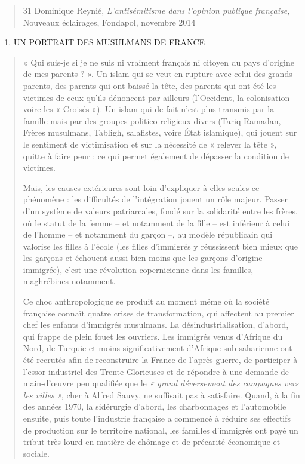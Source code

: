 \begin{quote}
31 Dominique Reynié, \emph{L'antisémitisme dans l'opinion publique
française,} Nouveaux éclairages, Fondapol, novembre 2014
\end{quote}

\begin{enumerate}
\def\labelenumi{\Roman{enumi}.}
\item
  UN PORTRAIT DES MUSULMANS DE FRANCE
\end{enumerate}

\begin{quote}
« Qui suis-je si je ne suis ni vraiment français ni citoyen du pays
d'origine de mes parents ? ». Un islam qui se veut en rupture avec celui
des grands-parents, des parents qui ont baissé la tête, des parents qui
ont été les victimes de ceux qu'ils dénoncent par ailleurs (l'Occident,
la colonisation voire les « Croisés »). Un islam qui de fait n'est plus
transmis par la famille mais par des groupes politico-religieux divers
(Tariq Ramadan, Frères musulmans, Tabligh, salafistes, voire État
islamique), qui jouent sur le sentiment de victimisation et sur la
nécessité de « relever la tête », quitte à faire peur ; ce qui permet
également de dépasser la condition de victimes.

Mais, les causes extérieures sont loin d'expliquer à elles seules ce
phénomène : les difficultés de l'intégration jouent un rôle majeur.
Passer d'un système de valeurs patriarcales, fondé sur la solidarité
entre les frères, où le statut de la femme -- et notamment de la fille
-- est inférieur à celui de l'homme -- et notamment du garçon --, au
modèle républicain qui valorise les filles à l'école (les filles
d'immigrés y réussissent bien mieux que les garçons et échouent aussi
bien moins que les garçons d'origine immigrée), c'est une révolution
copernicienne dans les familles, maghrébines notamment.

Ce choc anthropologique se produit au moment même où la société
française connaît quatre crises de transformation, qui affectent au
premier chef les enfants d'immigrés musulmans. La désindustrialisation,
d'abord, qui frappe de plein fouet les ouvriers. Les immigrés venus
d'Afrique du Nord, de Turquie et moins significativement d'Afrique
sub-saharienne ont été recrutés afin de reconstruire la France de
l'après-guerre, de participer à l'essor industriel des Trente Glorieuses
et de répondre à une demande de main-d'œuvre peu qualifiée que le
\emph{« grand déversement des campagnes vers les villes »,} cher à
Alfred Sauvy, ne suffisait pas à satisfaire. Quand, à la fin des années
1970, la sidérurgie d'abord, les charbonnages et l'automobile ensuite,
puis toute l'industrie française a commencé à réduire ses effectifs de
production sur le territoire national, les familles d'immigrés ont payé
un tribut très lourd en matière de chômage et de précarité économique et
sociale.


\end{quote}

